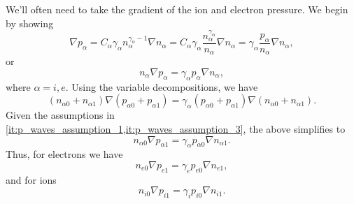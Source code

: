 \documentclass[a4paper,11pt]{report}
\begin{document}
We'll often need to take the gradient of the ion and electron pressure. We begin by showing
\begin{equation*}
    \nabla p_\alpha = C_\alpha \gamma_\alpha n_\alpha^{\gamma_\alpha-1} \nabla n_\alpha = C_\alpha \gamma_\alpha \frac{n_\alpha^{\gamma_\alpha}}{n_\alpha} \nabla n_\alpha = \gamma_\alpha \frac{p_\alpha}{n_\alpha} \nabla n_\alpha,
\end{equation*}
or
\begin{equation*}
    n_\alpha \nabla p_\alpha = \gamma_\alpha p_\alpha \nabla n_\alpha,
\end{equation*}
where $\alpha = i,e$. Using the variable decompositions, we have
\begin{equation*}
    \left ( n_{\alpha 0} + n_{\alpha 1} \right ) \nabla \left ( p_{\alpha 0} + p_{\alpha 1} \right ) = \gamma_\alpha \left ( p_{\alpha 0} + p_{\alpha 1} \right ) \nabla \left ( n_{\alpha 0} + n_{\alpha 1} \right ).
\end{equation*}
Given the assumptions in \cref{it:p_waves_assumption_1,it:p_waves_assumption_3}, the above simplifies to
\begin{equation}
    \label{eq:p_waves_alpha_pressure_linearized}
    n_{\alpha 0} \nabla p_{\alpha 1} = \gamma_\alpha p_{\alpha 0} \nabla n_{\alpha 1}.
\end{equation}
Thus, for electrons we have
\begin{equation}
    \label{eq:p_waves_e_pressure_linearized}
    n_{e0} \nabla p_{e1} = \gamma_e p_{e0} \nabla n_{e1},
\end{equation}
and for ions
\begin{equation}
    \label{eq:p_waves_i_pressure_linearized}
    n_{i0} \nabla p_{i1} = \gamma_i p_{i0} \nabla n_{i1}.
\end{equation}
\end{document}
